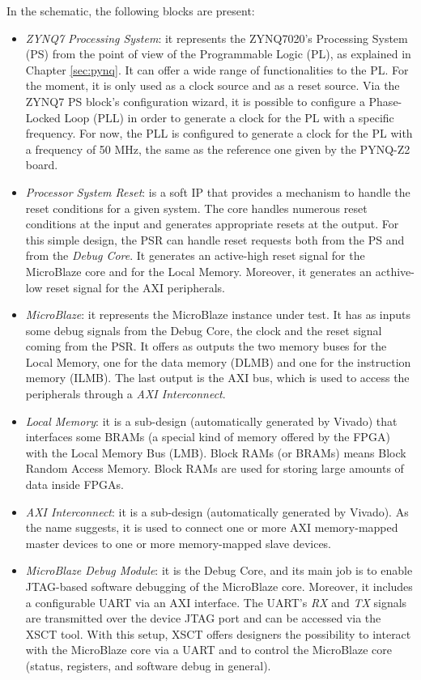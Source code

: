 In the schematic, the following blocks are present:
\begin{itemize}
    \item \textit{ZYNQ7 Processing System}: it represents the ZYNQ7020's Processing System (PS) from the point of view of the Programmable Logic (PL), as explained in Chapter \ref{sec:pynq}. It can offer a wide range of functionalities to the PL. For the moment, it is only used as a clock source and as a reset source. Via the ZYNQ7 PS block's configuration wizard, it is possible to configure a Phase-Locked Loop (PLL) in order to generate a clock for the PL with a specific frequency. For now, the PLL is configured to generate a clock for the PL with a frequency of 50 MHz, the same as the reference one given by the PYNQ-Z2 board.
    \item \textit{Processor System Reset}: is a soft IP that provides a mechanism to handle the reset conditions for a given system. The core handles numerous reset conditions at the input and generates appropriate resets at the output. For this simple design, the PSR can handle reset requests both from the PS and from the \textit{Debug Core}. It generates an active-high reset signal for the MicroBlaze core and for the Local Memory. Moreover, it generates an acthive-low reset signal for the AXI peripherals. 
    \item  \textit{MicroBlaze}: it represents the MicroBlaze instance under test. It has as inputs some debug signals from the Debug Core, the clock and the reset signal coming from the PSR. It offers as outputs the two memory buses for the Local Memory, one for the data memory (DLMB) and one for the instruction memory (ILMB). The last output is the AXI bus, which is used to access the peripherals through a \textit{AXI Interconnect}.
    \item \textit{Local Memory}: it is a sub-design (automatically generated by Vivado) that interfaces some BRAMs (a special kind of memory offered by the FPGA) with the Local Memory Bus (LMB). Block RAMs (or BRAMs) means Block Random Access Memory. Block RAMs are used for storing large amounts of data inside FPGAs.
    \item \textit{AXI Interconnect}: it is a sub-design (automatically generated by Vivado). As the name suggests, it is used to connect one or more AXI memory-mapped master devices to one or more memory-mapped slave devices.
    \item \textit{MicroBlaze Debug Module}: it is the Debug Core, and its main job is to enable JTAG-based software debugging of the MicroBlaze core. Moreover, it includes a configurable UART via an AXI interface. The UART's \textit{RX} and \textit{TX} signals are transmitted over the device JTAG port and can be accessed via the XSCT tool. With this setup, XSCT offers designers the possibility to interact with the MicroBlaze core via a UART and to control the MicroBlaze core (status, registers, and software debug in general).
\end{itemize}

